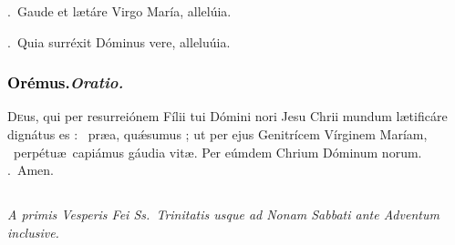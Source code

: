\documentclass[12pt]{article} %
\newenvironment{rubric}{\vspace{2 mm}\color{benred8} \itshape \leftskip 0in \setlength{\parindent}{0.25in}}{\vspace{2 mm}}
\newenvironment{response}{\leftskip 0in \setlength{\parindent}{0in}}{\vspace{2 mm}}
\let\oldgresixstar\gresixstar
\renewcommand{\gresixstar}{\textcolor{benred8}{\oldgresixstar}}
\let\oldgredagger\gredagger
\renewcommand{\gredagger}{\textcolor{benred8}{\oldgredagger}}
\let\oldVbar\Vbar
\renewcommand{\Vbar}{\textcolor{benred8}{\oldVbar .}}
\let\oldRbar\Rbar
\renewcommand{\Rbar}{\textcolor{benred8}{\oldRbar .}}
\def\capitulumSpace{\hspace{20 mm}}
\begin{document}

\gresetfirstlineaboveinitial{\small \textsc{ \textbf{\textcolor{benred8}{VI}}}}{\small \textsc{ \textbf{\textcolor{benred8}{VI}}}}

\vspace{2mm}

\begin{response}
\Vbar\ Gaude et l\ae t\'{a}re Virgo Mar\'{i}a, allel\'{u}ia.

\Rbar\ Quia surr\'{e}xit D\'{o}minus vere, allelu\'{u}ia.

\end{response}

\subsubsection*{\textcolor{black}{Or\'{e}mus.}\capitulumSpace \emph{Oratio.}}

\begin{response}\lettrine{D}{e}us, qui per resurrei\'{o}nem F\'{i}lii tui D\'{o}mini nori Jesu Chrii mundum l\ae tific\'{a}re dign\'{a}tus es : \gredagger\ pr\ae{}a, qu\'{\ae}sumus ; ut per ejus Genitr\'{i}cem V\'{i}rginem Mar\'{i}am, \gresixstar\ perp\'{e}tu\ae\ capi\'{a}mus g\'{a}udia vit\ae . Per e\'{u}mdem Chrium D\'{o}minum norum. \Rbar\ Amen.

\end{response}


\subsection*{}

\begin{rubric}
A primis Vesperis Fei Ss.~Trinitatis usque ad Nonam Sabbati ante Adventum inclusive.

\end{rubric}


{\grespacelinestext=4.60mm
\gresetfirstlineaboveinitial{\small \textsc{ \textbf{\textcolor{benred8}{I}}}}{\small \textsc{ \textbf{\textcolor{benred8}{I}}}}

}
\end{document}
